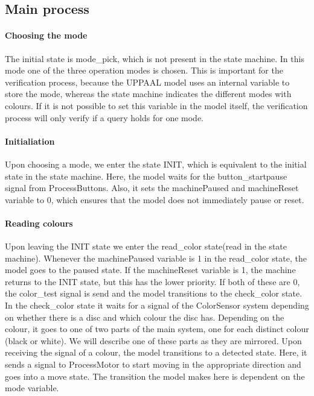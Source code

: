 \documentclass[a4paper,oneside,11pt]{article}
\begin{document}
\subsection{Main process}
\paragraph{Choosing the mode}
The initial state is mode\_pick, which is not present in the state machine. In this mode one of the three operation modes is chosen. This is important for the verification process, because the UPPAAL model uses an internal variable to store the mode, whereas the state machine indicates the different modes with colours. If it is not possible to set this variable in the model itself, the verification process will only verify if a query holds for one mode.

\paragraph{Initialiation}
Upon choosing a mode, we enter the state INIT, which is equivalent to the initial state in the state machine. Here, the model waits for the button\_startpause signal from ProcessButtons. Also, it sets the machinePaused and machineReset variable to 0, which ensures that the model does not immediately pause or reset.

\paragraph{Reading colours}
Upon leaving the INIT state we enter the read\_color state(read in the state machine). Whenever the machinePaused variable is 1 in the read\_color state, the model goes to the paused state. If the machineReset variable is 1, the machine returns to the INIT state, but this has the lower priority. If both of these are 0, the color\_test signal is send and the model transitions to the check\_color state.  In the check\_color state it waits for a signal of the ColorSensor system depending on whether there is a disc and which colour the disc has. Depending on the colour, it goes to one of two parts of the main system, one for each distinct colour (black or white). We will describe one of these parts as they are mirrored. Upon receiving the signal of a colour, the model transitions to a detected state. Here, it sends a signal to ProcessMotor to start moving in the appropriate direction and goes into a move state. The transition the model makes here is dependent on the mode variable.
\end{document}
